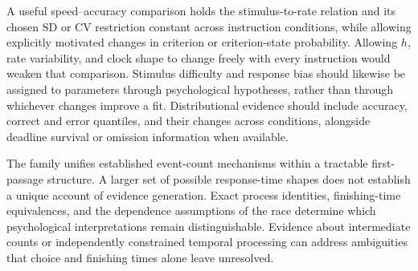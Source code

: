 \documentclass[12pt]{article}
\theoremstyle{definition}
\theoremstyle{plain}
\theoremstyle{remark}
\begin{document}
A useful speed--accuracy comparison holds the stimulus-to-rate relation and its chosen SD or CV restriction constant across instruction conditions, while allowing explicitly motivated changes in criterion or criterion-state probability. Allowing $h$, rate variability, and clock shape to change freely with every instruction would weaken that comparison. Stimulus difficulty and response bias should likewise be assigned to parameters through psychological hypotheses, rather than through whichever changes improve a fit. Distributional evidence should include accuracy, correct and error quantiles, and their changes across conditions, alongside deadline survival or omission information when available.

The family unifies established event-count mechanisms within a tractable first-passage structure. A larger set of possible response-time shapes does not establish a unique account of evidence generation. Exact process identities, finishing-time equivalences, and the dependence assumptions of the race determine which psychological interpretations remain distinguishable. Evidence about intermediate counts or independently constrained temporal processing can address ambiguities that choice and finishing times alone leave unresolved.
\end{document}
